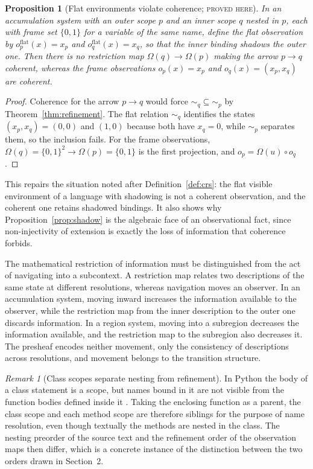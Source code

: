 \documentclass[11pt]{article}
\newtheorem{proposition}[theorem]{Proposition}
\theoremstyle{definition}
\theoremstyle{remark}
\newtheorem{remark}[theorem]{Remark}
\newcommand{\stN}{\textsc{proved here}}
\newcommand{\sk}{\sim}
\begin{document}
\begin{proposition}[Flat environments violate coherence; \stN]\label{prop:flat}
In an accumulation system with an outer scope $p$ and an inner scope $q$ nested in $p$, each with frame set $\{0,1\}$ for a variable of the same name, define the flat observation by $o^{\mathrm{flat}}_p(x)=x_p$ and $o^{\mathrm{flat}}_q(x)=x_q$, so that the inner binding shadows the outer one. Then there is no restriction map $\Omega(q)\to\Omega(p)$ making the arrow $p\to q$ coherent, whereas the frame observations $o_p(x)=x_p$ and $o_q(x)=(x_p,x_q)$ are coherent.
\end{proposition}
\begin{proof}
Coherence for the arrow $p\to q$ would force ${\sk_q}\subseteq{\sk_p}$ by Theorem~\ref{thm:refinement}. The flat relation $\sk_q$ identifies the states $(x_p,x_q)=(0,0)$ and $(1,0)$ because both have $x_q=0$, while $\sk_p$ separates them, so the inclusion fails. For the frame observations, $\Omega(q)=\{0,1\}^2\to\Omega(p)=\{0,1\}$ is the first projection, and $o_p=\Omega(u)\circ o_q$.
\end{proof}

This repairs the situation noted after Definition~\ref{def:crs}: the flat visible environment of a language with shadowing is not a coherent observation, and the coherent one retains shadowed bindings. It also shows why Proposition~\ref{prop:shadow} is the algebraic face of an observational fact, since non-injectivity of extension is exactly the loss of information that coherence forbids.

The mathematical restriction of information must be distinguished from the act of navigating into a subcontext. A restriction map relates two descriptions of the same state at different resolutions, whereas navigation moves an observer. In an accumulation system, moving inward increases the information available to the observer, while the restriction map from the inner description to the outer one discards information. In a region system, moving into a subregion decreases the information available, and the restriction map to the subregion also decreases it. The presheaf encodes neither movement, only the consistency of descriptions across resolutions, and movement belongs to the transition structure.

\begin{remark}[Class scopes separate nesting from refinement]
In Python the body of a class statement is a scope, but names bound in it are not visible from the function bodies defined inside it \cite{pyref}. Taking the enclosing function as a parent, the class scope and each method scope are therefore siblings for the purpose of name resolution, even though textually the methods are nested in the class. The nesting preorder of the source text and the refinement order of the observation maps then differ, which is a concrete instance of the distinction between the two orders drawn in Section~2.
\end{remark}
\end{document}
